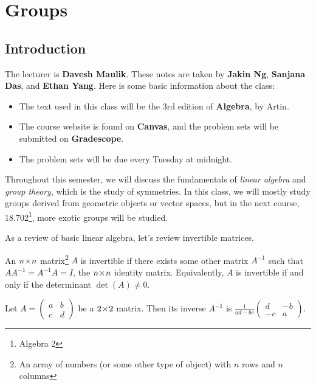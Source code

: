 
\section{Groups}
\subsection{Introduction}
The lecturer is \textbf{Davesh Maulik}. These notes are taken by \textbf{Jakin Ng}, \textbf{Sanjana Das}, and \textbf{Ethan Yang}. Here is some basic information about the class:
\begin{itemize}
    \item The text used in this class will be the 3rd edition of \textbf{Algebra}, by Artin. 

    \item The course website is found on \textbf{Canvas}, and the problem sets will be submitted on \textbf{Gradescope}. 
    
    \item The problem sets will be due every Tuesday at midnight.
\end{itemize}

Throughout this semester, we will discuss the fundamentals of \emph{linear algebra} and \emph{group theory}, which is the study of symmetries. In this class, we will mostly study groups derived from geometric objects or vector spaces, but in the next course, 18.702\footnote{Algebra 2}, more exotic groups will be studied. 

As a review of basic linear algebra, let's review invertible matrices.

\begin{definition}
An $n \hspace{0.05em}{\times}\hspace{0.05em} n$ matrix\footnote{An array of numbers (or some other type of object) with $n$ rows and $n$ columns} $A$ is invertible if there exists some other matrix $A^{-1}$ such that $AA^{-1} = A^{-1}A = I$, the $n \hspace{0.05em}{\times}\hspace{0.05em} n$ identity matrix. Equivalently, $A$ is invertible if and only if the determinant $\det(A) \neq 0.$  
\end{definition}

\begin{example}[$n = 2$]
Let $A = \begin{pmatrix}a & b \\ c & d\end{pmatrix}$ be a $2 \hspace{0.05em}{\times}\hspace{0.05em} 2$ matrix. Then its inverse $A^{-1}$ is $\frac{1}{ad-bc}\begin{pmatrix}
d & -b \\ -c & a
\end{pmatrix}$.
\end{example}

